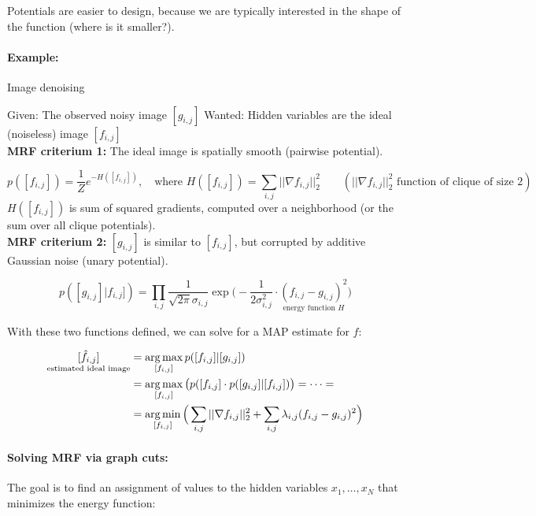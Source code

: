 Potentials are easier to design, because we are typically interested in the shape of the function (where is it smaller?).

\paragraph{Example:} Image denoising 

Given: The observed noisy image $[g_{i,j}]$ \quad Wanted: Hidden variables are the ideal (noiseless) image $[f_{i,j}]$\\

\textbf{MRF criterium 1:} The ideal image is spatially smooth (pairwise potential).

\begin{equation*}
	p([f_{i,j}]) = \frac{1}{Z} e^{-H([f_{i,j}])}, \quad \text{where } H([f_{i,j}]) = \sum_{i,j} ||\nabla f_{i,j}||_2^2 \qquad (||\nabla f_{i,j}||_2^2 \text{ function of clique of size 2})
\end{equation*}
$ H([f_{i,j}]) $ is sum of squared gradients, computed over a neighborhood (or the sum over all clique potentials).\\

\textbf{MRF criterium 2:} $[g_{i,j}]$ is similar to $[f_{i,j}]$, but corrupted by additive Gaussian noise (unary potential).

\begin{equation*}
	p([g_{i,j}] | f_{i,j}]) = \prod_{i,j} \frac{1}{\sqrt{2 \pi} \sigma_{i,j}} \exp\Big(- \frac{1}{2 \sigma_{i,j}^2} \cdot \underset{\text{energy function $H$}}{(f_{i,j} - g_{i,j})^2}\Big)
\end{equation*}

With these two functions defined, we can solve for a MAP estimate for $f$:

\begin{align*}
	\underset{\text{estimated ideal image}}{[\hat{f}_{i,j}]} &= \operatorname*{arg\,max}_{[f_{i,j}]} p([f_{i,j}] | [g_{i,j}])\\
					&= \operatorname*{arg\,max}_{[f_{i,j}]} \big(p([f_{i,j}] \cdot p([g_{i,j}] | [f_{i,j}])\big)=\dots=\\
					&= \operatorname*{arg\,min}_{[f_{i,j}]} \Big(\sum_{i,j} ||\nabla f_{i,j}||_2^2 + \sum_{i,j} \lambda_{i,j} (f_{i,j} - g_{i,j})^2\Big)
\end{align*}

\paragraph{Solving MRF via graph cuts:} 
The goal is to find an assignment of values to the hidden variables $x_1, \dots,x_N$ that minimizes the energy function:


